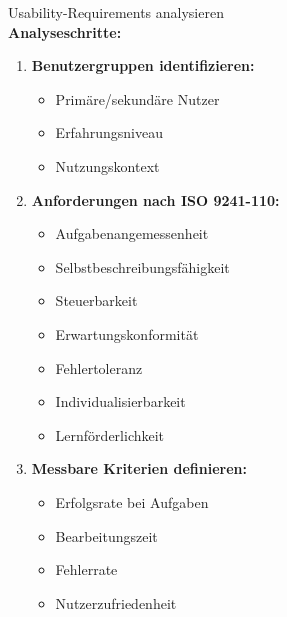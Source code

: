 \begin{KR}{Usability-Requirements analysieren}\\
    \small
\textbf{Analyseschritte:}
\begin{enumerate}
    \item \textbf{Benutzergruppen identifizieren:}
    \begin{itemize}
        \item Primäre/sekundäre Nutzer
        \item Erfahrungsniveau
        \item Nutzungskontext
    \end{itemize}
    
    \item \textbf{Anforderungen nach ISO 9241-110:}
    \begin{itemize}
        \item Aufgabenangemessenheit
        \item Selbstbeschreibungsfähigkeit
        \item Steuerbarkeit
        \item Erwartungskonformität
        \item Fehlertoleranz
        \item Individualisierbarkeit
        \item Lernförderlichkeit
    \end{itemize}
    
    \item \textbf{Messbare Kriterien definieren:}
    \begin{itemize}
        \item Erfolgsrate bei Aufgaben
        \item Bearbeitungszeit
        \item Fehlerrate
        \item Nutzerzufriedenheit
    \end{itemize}
\end{enumerate}
\end{KR}

